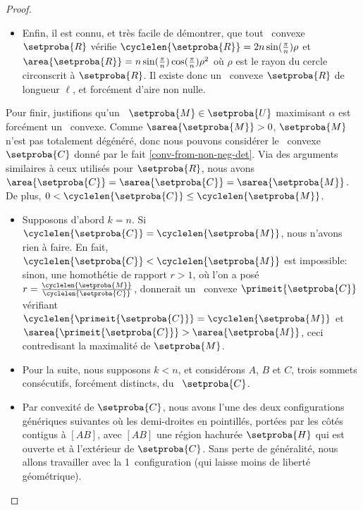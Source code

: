 \begin{proof}
\begin{itemize}
        \item Enfin, il est connu, et très facile de démontrer, que tout \nreg\ convexe $\setproba{R}$ vérifie
        $\cyclelen{\setproba{R}} = 2 n \sin (\frac{\pi}{n}) \rho$
        et
        $\area{\setproba{R}} = n \sin (\frac{\pi}{n})  \cos (\frac{\pi}{n}) \rho^2$
        où $\rho$ est le rayon du cercle circonscrit à $\setproba{R}$.
        Il existe donc un \nreg\ convexe $\setproba{R}$ de longueur $\ell$, et forcément d'aire non nulle.
    \end{itemize}


    Pour finir, justifions qu'un \ncycle\ $\setproba{M} \in \setproba{U}$ maximisant $\alpha$ est forcément un \ngone\ convexe.
    Comme $\sarea{\setproba{M}} > 0$, $\setproba{M}$ n'est pas totalement dégénéré,
    donc nous pouvons considérer le \kgone\ convexe $\setproba{C}$ donné par le fait \ref{conv-from-non-neg-det}.
    Via des arguments similaires à ceux utilisés pour $\setproba{R}$,
    nous avons $\area{\setproba{C}} = \sarea{\setproba{C}} = \sarea{\setproba{M}}$.
    De plus,
    $0 < \cyclelen{\setproba{C}} \leq \cyclelen{\setproba{M}}$.
    \begin{itemize}
        \item Supposons d'abord $k = n$.
        Si $\cyclelen{\setproba{C}} = \cyclelen{\setproba{M}}$, nous n'avons rien à faire.
        En fait, $\cyclelen{\setproba{C}} < \cyclelen{\setproba{M}}$ est impossible:
        sinon, une homothétie de rapport $r > 1$, où l'on a posé $r = \frac{ \cyclelen{\setproba{M}} }{ \cyclelen{\setproba{C}} }$, donnerait un \ngone\ convexe $\primeit{\setproba{C}}$ vérifiant
        $\cyclelen{\primeit{\setproba{C}}} = \cyclelen{\setproba{M}}$
        et
        $\sarea{\primeit{\setproba{C}}} > \sarea{\setproba{M}}$, ceci contredisant la maximalité de $\setproba{M}$.


        \item Pour la suite, nous supposons $k < n$, et considérons $A$, $B$ et $C$, trois sommets consécutifs, forcément distincts, du \kgone\ $\setproba{C}$.


        \item Par convexité de $\setproba{C}$, nous avons l'une des deux configurations génériques suivantes où les demi-droites en pointillés, portées par les côtés contigus à $[AB]$,  avec $[AB]$ une région hachurée $\setproba{H}$ qui est ouverte et à l'extérieur de $\setproba{C}$.
        Sans perte de généralité, nous allons travailler avec la 1\iere\ configuration (qui laisse moins de liberté géométrique).
        \begin{multicols}{2}
            \centering


\end{multicols}
\end{itemize}
\end{proof}
